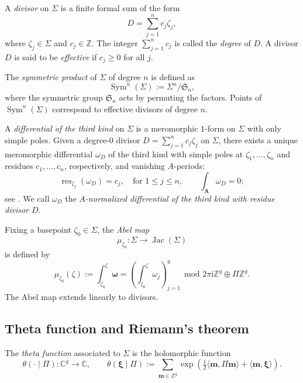 \documentclass[12pt]{amsart}
\numberwithin{equation}{section}
\theoremstyle{definition}
\newcommand{\Z}{\mathbb{Z}}
\newcommand{\C}{\mathbb{C}}
\def\res{\operatorname{res}}
\def\divisor{D}
\def\imunit{{\mathrm{i}}}
\def\sym{\operatorname{Sym}}
\def\jac{{\operatorname{Jac}}}
\def\divisor{D}
\def\vecptjac{\bm{\xi}}
\def\ptC{{\bm{z}}} %
\def\ptZ{\bm{m}} %
\def\<{\langle}
\def\>{\rangle}
\def\divptgeom{\zeta}
\def\ptCg{\vecptjac}
\def\ptSig{\zeta}
\def\basept{{\ptSig_0}}
\def\mcurve{\Sigma}
\begin{document}
A \emph{divisor} on $\mcurve$ is a finite formal sum of the form \[ \divisor = \sum_{j=1}^n c_j \divptgeom_j, \] where $\divptgeom_j \in \mcurve$ and $c_j \in \Z$. The integer $\sum_{j=1}^n c_j$ is called the \emph{degree} of $\divisor$. A divisor $\divisor$ is said to be \emph{effective} if $c_j \geq 0$ for all $j$. 

The \emph{symmetric product} of $\mcurve$ of degree $n$ is defined as \begin{equation}\label{eq:sym_dfn} \sym^n(\mcurve) := \mcurve^n / \mathfrak S_n, \end{equation} where the symmetric group $\mathfrak S_n$ acts by permuting the factors. Points of $\sym^n(\mcurve)$ correspond to effective divisors of degree $n$.

A \emph{differential of the third kind} on $\mcurve$ is a meromorphic $1$-form on $\mcurve$ with only simple poles. Given a degree-$0$ divisor $\divisor = \sum_{j=1}^n c_j \divptgeom_j$ on $\mcurve$, there exists a unique meromorphic differential $\omega_\divisor$ of the third kind with simple poles at $\divptgeom_1,\dots,\divptgeom_n$ and residues $c_1,\dots,c_n$, respectively, and vanishing $A$-periods:
\[	
\res_{\divptgeom_j}(\omega_\divisor) = c_j, \quad \text{for } 1\leq j\leq n,  \qquad \int_{\bm A} \omega_\divisor = 0; 
\]
see \cite[Chapter~I]{Fay}. We call $\omega_\divisor$ the \emph{$A$-normalized differential of the third kind with residue divisor $\divisor$}.


Fixing a basepoint $\basept \in \mcurve$, the \emph{Abel map}
\[
\mu_\basept : \mcurve \rightarrow \jac(\mcurve)
\]
is defined by
\[
\mu_\basept(\ptSig) :=  \int_{\basept}^{\ptSig} \bm \omega  = \left(\int_\basept^{\ptSig} \omega_j \right)_{j=1}^g \ \ \text{mod } 2\pi \imunit\Z^{g} \oplus \Pi \Z^{g}.
\]
The Abel map extends linearly to divisors.



\subsection{Theta function and Riemann's theorem} \label{sec:theta_fn}

The \emph{theta function} associated to $\mcurve$ is the holomorphic function
\[
\theta(\cdot \mid \Pi):\C^{g}\to\C,\qquad 
\theta(\ptCg \mid \Pi) := 
\sum_{\ptZ \in \Z^{g}} \exp(\tfrac{1}{2} \<\ptZ,\Pi \ptZ \> + \<\ptZ,\ptCg \>).
\]
\end{document}
